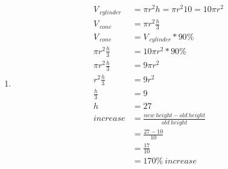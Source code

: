 \documentclass[11pt]{article}
\begin{document}
\begin{enumerate}
    \pagebreak
    \item
        \begin{equation*}
            \begin{split}
                V_{\ cylinder}&=\pi r^2h=\pi r^2 10=10\pi r^2\\
                V_{\ cone}&=\pi r^2\frac{h}{3}\\
                V_{\ cone}&=V_{\ cylinder}*90\%\\
                \pi r^2\frac{h}{3}&=10\pi r^2*90\%\\
                \pi r^2\frac{h}{3}&=9\pi r^2\\
                r^2\frac{h}{3}&=9r^2\\
                \frac{h}{3}&=9\\
                h&=27\\
                increase&=\frac{new\ height-old\ height}{old\ height}\\
                &=\frac{27-10}{10}\\
                &=\frac{17}{10}\\
                &=170\%\ increase
            \end{split}
        \end{equation*}
    \end{enumerate}
\end{document}
